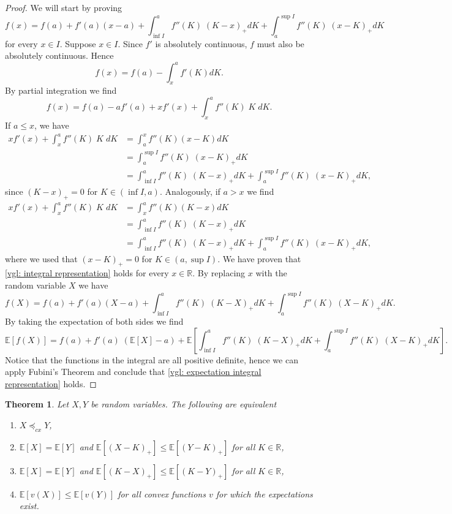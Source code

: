 \documentclass{article}
\newtheorem{theorem}{Theorem}
\begin{document}
\begin{proof}
    We will start by proving 
    \begin{equation}\label{vgl: integral representation}
        f(x) = f(a) + f'(a)(x-a) + \int_{\inf I}^af''(K)\;(K-x)_+dK + \int^{\sup I}_af''(K)\;(x-K)_+dK
    \end{equation}
    for every $x\in I$. Suppose $x\in I$. Since $f'$ is absolutely continuous, $f$ must also be absolutely continuous. Hence
    $$f(x) = f(a) - \int_x^af'(K)dK.$$
    By partial integration we find
    $$f(x) = f(a) - af'(a)+xf'(x) + \int_x^af''(K)\;K\;dK.$$
    If $a \leq x$, we have
    \begin{align*}
    xf'(x) + \int_x^af''(K)\;K\;dK &= \int_a^xf''(K)(x-K)dK\\
    &= \int^{\sup I}_af''(K)\;(x-K)_+dK\\
    &= \int_{\inf I}^af''(K)\;(K-x)_+dK + \int^{\sup I}_af''(K)\;(x-K)_+dK,
    \end{align*}
    since $(K-x)_+ = 0$ for $K \in (\inf I, a)$. Analogously, if $a> x$ we find
    \begin{align*}
    xf'(x) + \int_x^af''(K)\;K\;dK &= \int_x^af''(K)(K-x)dK\\
    &= \int_{\inf I}^af''(K)\;(K-x)_+dK\\
    &= \int_{\inf I}^af''(K)\;(K-x)_+dK + \int^{\sup I}_af''(K)\;(x-K)_+dK,
    \end{align*}
    where we used that $(x-K)_+ = 0$ for $K \in (a, \sup I)$. We have proven that \eqref{vgl: integral representation} holds for every $x\in \mathbb{R}$. By replacing $x$ with the random variable $X$ we have
    \begin{equation}
        f(X) = f(a) + f'(a)(X-a) + \int_{\inf I}^af''(K)\;(K-X)_+dK + \int^{\sup I}_af''(K)\;(X-K)_+dK.
    \end{equation}
    By taking the expectation of both sides we find
    $$\mathbb{E}[f(X)] = f(a) + f'(a)\;(\mathbb{E}[X] - a) + \mathbb{E}\left[\int_{\inf I}^af''(K)\;(K-X)_+dK + \int^{\sup I}_af''(K)\;(X-K)_+dK\right]. $$
    Notice that the functions in the integral are all positive definite, hence we can apply Fubini's Theorem and conclude that \eqref{vgl: expectation integral representation} holds.
\end{proof}
\begin{theorem} \cite[Section 3.A.1]{shaked-2007}\label{equivalent definitions cx}
    Let $X,Y$ be random variables. The following are equivalent
    \begin{enumerate}
        \item $ X\preceq_{cx}Y$,
        \item $\mathbb{E}[X] = \mathbb{E}[Y]$ and $\mathbb{E}[(X-K)_+] \leq \mathbb{E}[(Y-K)_+]$ for all $K\in \mathbb{R}$,
        \item $\mathbb{E}[X] = \mathbb{E}[Y]$ and $\mathbb{E}[(K-X)_+] \leq \mathbb{E}[(K-Y)_+]$ for all $K\in \mathbb{R}$,
        \item $\mathbb{E}[v(X)] \leq \mathbb{E}[v(Y)]$ for all convex functions $v$ for which the expectations exist.
    \end{enumerate}
\end{theorem}
\end{document}
